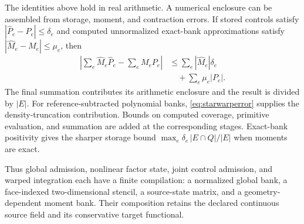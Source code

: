 The identities above hold in real arithmetic. A numerical enclosure can be
assembled from storage, moment, and contraction errors. If stored controls
satisfy $|\widehat P_e-P_e|\leq\delta_e$ and computed unnormalized exact-bank
approximations satisfy $|\widehat M_e-M_e|\leq\mu_e$, then
\begin{align}
 \left|\sum_e\widehat M_e\widehat P_e-\sum_eM_eP_e\right|
 &\leq\sum_e|\widehat M_e|\delta_e\nonumber\\
 &\quad+\sum_e\mu_e|P_e|.
\end{align}
The final summation contributes its arithmetic enclosure and the result is
divided by $|E|$. For reference-subtracted polynomial banks,
\eqref{eq:starwarperror} supplies the density-truncation contribution.
Bounds on computed coverage, primitive evaluation, and summation are added
at the corresponding stages. Exact-bank positivity gives the sharper storage
bound $\max_e\delta_e\,|E\cap Q|/|E|$ when moments are exact.

Thus global admission, nonlinear factor state, joint control admission, and
warped integration each have a finite compilation: a normalized global bank,
a face-indexed two-dimensional stencil, a source-state matrix, and a
geometry-dependent moment bank. Their composition retains the declared
continuous source field and its conservative target functional.
